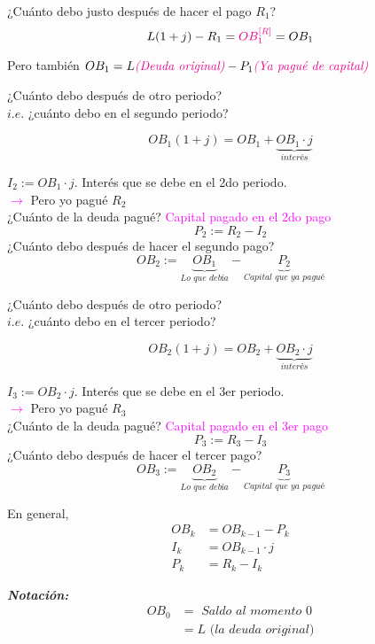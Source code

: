 ¿Cuánto debo justo después de hacer el pago $R_1$?
$$L(1+j) - R_1 = \textcolor{magenta}{OB_1^{[R]}} = OB_1$$

Pero también $OB_1 = L\textcolor{magenta}{\textit{(Deuda original)}} -P_1\textcolor{magenta}{\textit{(Ya pagué de capital)}}$

¿Cuánto debo después de otro periodo?\\
$i.e.$ ¿cuánto debo en el segundo periodo?

$$OB_1(1+j) = OB_1 + \underbrace{OB_1\cdot j}_{\textit{interés}}$$

$I_2 := OB_1\cdot j$. Interés que se debe en el 2do periodo.\\
\textcolor{magenta}{$\longrightarrow$} Pero yo pagué $R_2$\\
¿Cuánto de la deuda pagué? \textcolor{magenta}{Capital pagado en el 2do pago}
$$P_2 := R_2 - I_2$$
¿Cuánto debo después de hacer el segundo pago?
$$OB_2 := \underbrace{OB_1}_{\textit{Lo que debía}} - \underbrace{P_2}_{\textit{Capital que ya pagué}}$$

¿Cuánto debo después de otro periodo?\\
$i.e.$ ¿cuánto debo en el tercer periodo?

$$OB_2(1+j) = OB_2 + \underbrace{OB_2\cdot j}_{\textit{interés}}$$

$I_3 := OB_2\cdot j$. Interés que se debe en el 3er periodo.\\
\textcolor{magenta}{$\longrightarrow$} Pero yo pagué $R_3$\\
¿Cuánto de la deuda pagué? \textcolor{magenta}{Capital pagado en el 3er pago}
$$P_3 := R_3 - I_3$$
¿Cuánto debo después de hacer el tercer pago?
$$OB_3 := \underbrace{OB_2}_{\textit{Lo que debía}} - \underbrace{P_3}_{\textit{Capital que ya pagué}}$$

En general, 
\begin{align*}
    OB_k &= OB_{k-1} - P_k\\
    I_k &= OB_{k-1}\cdot j\\
    P_k &= R_k - I_k
\end{align*}

\textit{\textbf{Notación:}} \begin{align*}
    OB_0 &= \textit{ Saldo al momento } 0\\
    &= L \textit{ (la deuda original)}
\end{align*}

